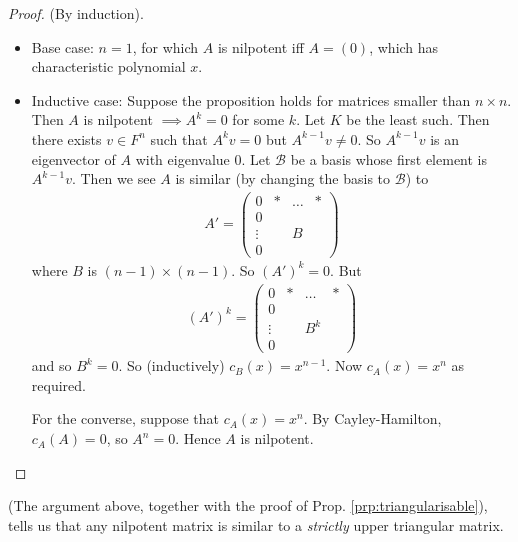 \documentclass{article}
\theoremstyle{definition} \newtheorem*{definition}{Definition}
\begin{document}
    \begin{proof}
      (By induction). 
      \begin{itemize}
        \item Base case: $n=1$, for which $A$ is nilpotent iff $A=\left( 0
          \right)$, which has characteristic polynomial $x$.
        \item Inductive case:
          Suppose the proposition holds for matrices smaller than $n\times
          n$. Then $A$ is nilpotent $\implies A^k = 0$ for some $k$. Let
          $K$ be the
          least such. Then there exists $v \in F^n$ such that $A^k v = 0$
          but $A^{k-1}v \neq 0$. So $A^{k-1}v$ is an eigenvector of $A$
          with eigenvalue 0. Let $\mathcal{B}$ be a basis whose 
          first element is $A^{k-1}v$. Then we see $A$ is similar (by
          changing the basis to $\mathcal{B}$) to 
          \begin{align*}A'=
            \left( 
            \begin{matrix}
              0 & * & \dots & *\\
              0 & &&\\
              \vdots&&B&\\
              0&&&
            \end{matrix}
            \right)
          \end{align*}
          where $B$ is $(n-1)\times(n-1)$. So $(A')^k = 0$. But
          \begin{align*}
            (A')^k = \left( 
            \begin{matrix}
              0 & * & \dots & *\\
              0 & &&\\
              \vdots&&B^k&\\
              0&&&
            \end{matrix}
            \right)
          \end{align*} and so $B^k = 0$. So (inductively) $c_B(x)=x^{n-1}$.
          Now $c_A(x)=x^n$ as required.

          For the converse, suppose that $c_A(x)=x^n$. By 
          Cayley-Hamilton, $c_A(A)=0$, so $A^n=0$. Hence $A$ is nilpotent.
      \end{itemize}
    \end{proof}

    (The argument above, together with the proof of Prop. \ref{prp:triangularisable}), tells us that any nilpotent matrix is similar to a \textit{strictly} upper triangular matrix.
\end{document}
